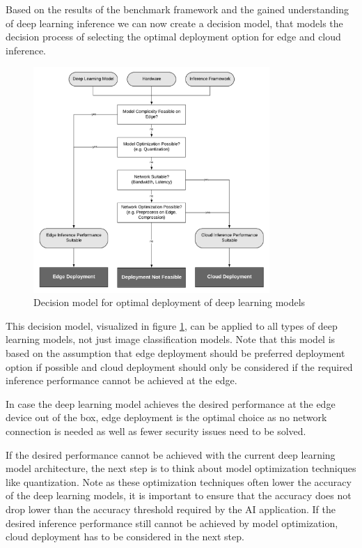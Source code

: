 Based on the results of the benchmark framework and the gained understanding of deep learning inference we can now create a decision model, that models the decision process of selecting the optimal deployment option for edge and cloud inference.

\begin{figure}[!htb]
\centering
\includegraphics[width=0.8\textwidth]{./Bilder/DecisionModel.pdf}
\caption{Decision model for optimal deployment of deep learning models}
\label{fig:DecisionModel}
\end{figure}


This decision model, visualized in figure \ref{fig:DecisionModel}, can be applied to all types of deep learning models, not just image classification models.
Note that this model is based on the assumption that edge deployment should be preferred deployment option if possible and cloud deployment should only be considered if the required inference performance cannot be achieved at the edge.


In case  the deep learning model achieves the desired performance at the edge device out of the box, edge deployment is the optimal choice as no network connection is needed as well as fewer security issues need to be solved.

If the desired performance cannot be achieved with the current deep learning model architecture, the next step is to think about model optimization techniques like quantization.
Note as these optimization techniques often lower the accuracy of the deep learning models, it is important to ensure that the accuracy does not drop lower than the accuracy threshold required by the AI application.
If the desired inference performance still cannot be achieved by model optimization, cloud deployment has to be considered in the next step.

